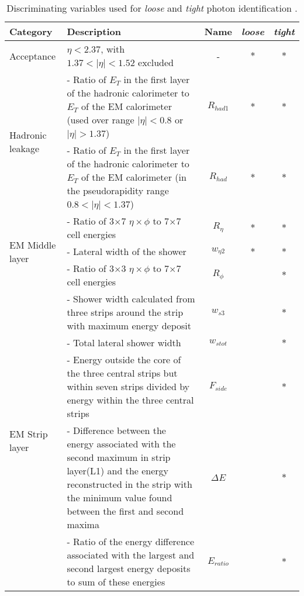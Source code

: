 \documentclass[a4paper, oneside, 11pt, openright]{book}
\begin{document}
				\begin{center}
					\begin{table}
						\centering
						\begin{tabular}{lp{6cm}ccc}
							\toprule[1.5pt]
							\textbf{Category} & \textbf{Description} & \textbf{Name} & \textbf{\textit{loose}} & \textbf{\textit{tight}}\\
							\midrule
							Acceptance & $\eta<2.37$, with $1.37<|\eta|<1.52$ excluded & - & $\ast$ & $\ast$ \\
							\midrule
							\multirow[t]{2}{*}{Hadronic leakage} 
							& {- Ratio of $E_T$ in the first layer of the hadronic calorimeter to $E_T$ of the EM calorimeter (used over range $|\eta| < 0.8$ or $|\eta| > 1.37$)} & $R_{had1}$ & $\ast$ & $\ast$  \\ 
							& - Ratio of $E_T$ in the first layer of the hadronic calorimeter to $E_T$ of the EM calorimeter (in the pseudorapidity range $0.8 < |\eta| < 1.37$) & $R_{had}$  & $\ast$ & $\ast$ \\
							\midrule
							\multirow[t]{3}{*}{EM Middle layer}
							& - Ratio of 3$\times$7 $\eta\times\phi$ to 7$\times$7 cell energies & $R_{\eta}$ & $\ast$ & $\ast$ \\
							& - Lateral width of the shower & $w_{\eta2}$ & $\ast$ & $\ast$ \\
							& - Ratio of 3$\times$3 $\eta\times\phi$ to 7$\times$7 cell energies & $R_{\phi}$ &  & $\ast$ \\
							\midrule
							\multirow[t]{5}{*}{EM Strip layer}
							& - Shower width calculated from three strips around the strip with maximum energy deposit & $w_{s3}$ &  & $\ast$ \\
							& - Total lateral shower width & $w_{stot}$ &  & $\ast$ \\
							& - Energy outside the core of the three central strips but within seven strips divided by energy within the three central strips & $F_{side}$ &  & $\ast$ \\
							& - Difference between the energy associated with the second maximum in strip layer(L1) and the energy reconstructed in the strip with the minimum value found between the first and second maxima & $\Delta E$ &  & $\ast$ \\
							& - Ratio of the energy difference associated with the largest and second largest energy deposits to sum of these energies & $E_{ratio}$ &  & $\ast$ \\
							\bottomrule
						\end{tabular}
						\caption{Discriminating variables used for \textit{loose} and \textit{tight} photon identification \cite{ph_id}.}
						\label{tab:ph parameters}
					\end{table}
				\end{center}
						
\end{document}
